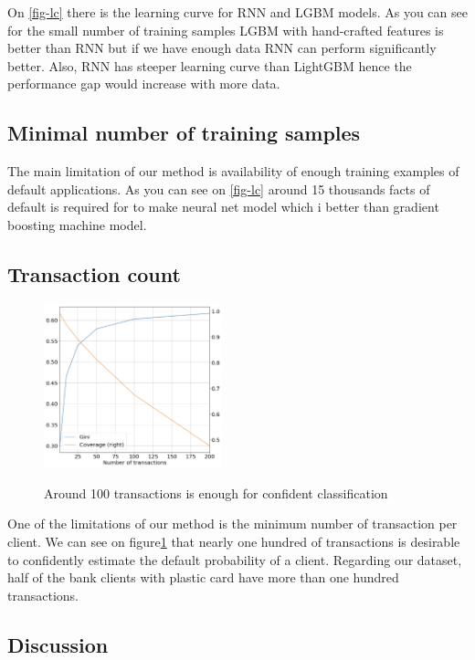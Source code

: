 \documentclass{sigkddExp}
\begin{document}
On \ref{fig-lc} there is the learning curve for RNN and LGBM models. As you can see for the small number of training samples LGBM with hand-crafted features is better than RNN but if we have enough data RNN can perform significantly better. Also, RNN has steeper learning curve than LightGBM hence the performance gap would increase with more data.

\subsection{Minimal number of training samples}

The main limitation of our method is availability of enough training examples of default applications. As you can see on \ref{fig-lc} around 15 thousands facts of default is required for to make neural net model which i
 better than gradient boosting machine model.

\subsection{Transaction count}

\begin{figure}
  \caption{Around 100 transactions is enough for confident classification}
  \includegraphics[width=0.46\textwidth]{information-vs-accuracy.png}
  \label{fig-tc}
\end{figure}

One of the limitations of our method is the minimum number of transaction per client. We can see on figure\ref{fig-tc} that nearly one hundred of transactions is desirable to confidently estimate the default probability of a client. Regarding our dataset, half of the bank clients with plastic card have more than one hundred transactions.

\subsection{Discussion}
\end{document}
